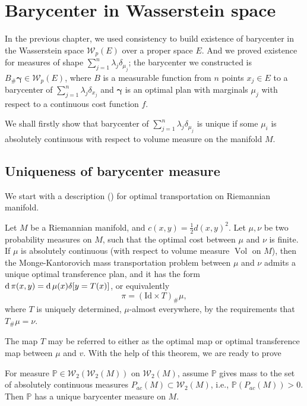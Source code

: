 \section{Barycenter in Wasserstein space}

In the previous chapter,
we used consistency to build existence of barycenter in the Wasserstein space
$\mathcal{W}_p(E)$ over a proper space $E$.
And we proved existence for measures of shape $\sum_{j=1}^{n} \lambda_j \delta_{\mu_j}$;
the barycenter we constructed is $B_{\#}\boldsymbol{\gamma} \in \mathcal{W}_p(E)$,
where $B$ is a measurable function from $n$ points $x_j \in E$ to a barycenter of
$\sum_{j=1}^{n} \lambda_j \delta_{x_j}$
and $\boldsymbol{\gamma}$ is an optimal plan with marginals $\mu_j$ with respect to a continuous cost function $f$.

We shall firstly show that barycenter of $\sum_{j=1}^n \lambda_j \delta_{\mu_j}$
is unique if some $\mu_i$
is absolutely continuous with respect to volume measure on the manifold $M$.

\subsection{Uniqueness of barycenter measure}

We start with a description (\cite[Theorem 10.41]{villani2008optimal})
for optimal transportation on Riemannian manifold.
\begin{thm}
	\label{thm:uniquness_monge_problem_manifold}
	Let \( M \) be a Riemannian manifold, and \( c ( x , y ) = \frac{1}{2} d ( x , y ) ^ { 2 } \).
	Let \( \mu , \nu \) be two probability measures on \( M \), such that the optimal cost
	between \( \mu \) and \( \nu \) is finite.
	If \( \mu \) is absolutely continuous (with respect to volume measure $\operatorname{Vol}$ on $M$),
	then the Monge-Kantorovich mass transportation
	problem between \( \mu \) and \( \nu \) admits a unique optimal transference plan, and it
	has the form \( \operatorname{d} \pi ( x , y ) = \operatorname{d} \mu ( x ) \delta [ y = T ( x ) ] \),
	or equivalently \[ \pi = ( \mathrm { Id } \times T )_{\#} \mu , \]
	where \( T \) is uniquely determined, \( \mu \)-almost everywhere,
	by the requirements that \( T_{\#} \mu = \nu \).
\end{thm}

The map \( T \) may be referred to either as
the optimal map or optimal transference map between \( \mu \) and \( v \).
With the help of this theorem, we are ready to prove
\begin{prop}
	\label{prop:uniquness_barycenter_Wasserstein}
	For measure $\mathbb{P} \in \mathcal{W}_2(\mathcal{W}_2(M))$ on $\mathcal{W}_2(M)$,
	assume $\mathbb{P}$ gives mass to the set of absolutely continuous measures $P_{ac}(M) \subset \mathcal{W}_2(M)$,
	i.e.,	$\mathbb{P}(P_{ac}(M)) > 0 $.
	Then $\mathbb{P}$ has a unique barycenter measure on $M$.
\end{prop}

